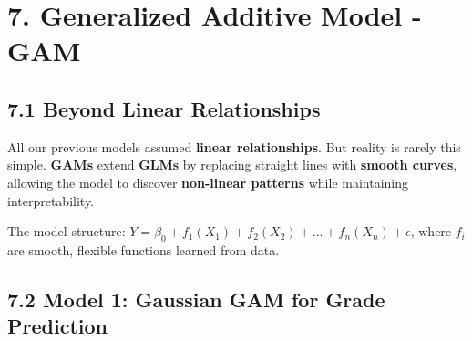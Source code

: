 \documentclass[
]{article}
\begin{document}
\section{7. Generalized Additive Model -
GAM}\label{generalized-additive-model---gam}

\subsection{7.1 Beyond Linear
Relationships}\label{beyond-linear-relationships}

All our previous models assumed \textbf{linear relationships}. But
reality is rarely this simple. \textbf{GAMs} extend \textbf{GLMs} by
replacing straight lines with \textbf{smooth curves}, allowing the model
to discover \textbf{non-linear patterns} while maintaining
interpretability.

The model structure:
\(Y = \beta_0 + f_1(X_1) + f_2(X_2) + ... + f_n(X_n) + \epsilon\), where
\(f_i\) are smooth, flexible functions learned from data.

\subsection{7.2 Model 1: Gaussian GAM for Grade
Prediction}\label{model-1-gaussian-gam-for-grade-prediction}
\end{document}
